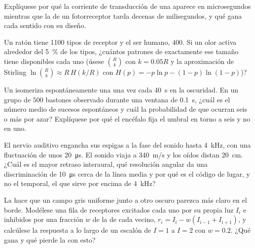\begin{exercise}[$\star\star$]\label{exo:b3:sensory-systems:8}
Explíquese por qué la corriente de transducción de una 
aparece en microsegundos mientras que la de un fotorreceptor tarda
decenas de milisegundos, y qué gana cada sentido con su diseño.
\end{exercise}

\begin{exercise}[$\star\star$]\label{exo:b3:sensory-systems:9}
Un ratón tiene \num{1100} tipos de receptor y el ser humano, $400$. Si
un olor activa alrededor del \qty{5}{\%} de los tipos, ¿cuántos
patrones de exactamente ese tamaño tiene disponibles cada uno (úsese
$\binom{R}{k}$ con $k = 0.05R$ y la aproximación de Stirling
$\ln\binom{R}{k} \approx R\,H(k/R)$ con
$H(p) = -p\ln p - (1-p)\ln(1-p)$)?
\end{exercise}

\begin{exercise}[$\star\star\star$]\label{exo:b3:sensory-systems:10}
Un  isomeriza espontáneamente una  una vez cada
\qty{40}{s} en la oscuridad. En un grupo de $500$ bastones observado
durante una ventana de \qty{0.1}{s}, ¿cuál es el número medio de
sucesos espontáneos y cuál la probabilidad de que ocurran seis o más
por azar? Explíquese por qué el encéfalo fija el umbral en torno a seis
y no en uno.
\end{exercise}

\begin{exercise}[$\star\star\star$]\label{exo:b3:sensory-systems:11}
El nervio auditivo engancha sus espigas a la fase del sonido hasta
\qty{4}{kHz}, con una fluctuación de unos \qty{20}{\micro s}. El sonido
viaja a \qty{340}{m/s} y los oídos distan \qty{20}{cm}. ¿Cuál es el
mayor retraso interaural, qué resolución angular da una discriminación
de \qty{10}{\micro s} cerca de la línea media y por qué es el código de
lugar, y no el temporal, el que sirve por encima de \qty{4}{kHz}?
\end{exercise}

\begin{exercise}[$\star\star\star$]\label{exo:b3:sensory-systems:12}
La  hace que un campo gris uniforme junto a otro
oscuro parezca más claro en el borde. Modélese una fila de receptores
excitados cada uno por su propia luz $I_{i}$ e inhibidos por una
fracción $w$ de la de cada vecino,
$r_{i} = I_{i} - w(I_{i-1} + I_{i+1})$, y calcúlese la respuesta a lo
largo de un escalón de $I = 1$ a $I = 2$ con $w = 0.2$. ¿Qué gana y qué
pierde la  con esto?
\end{exercise}

